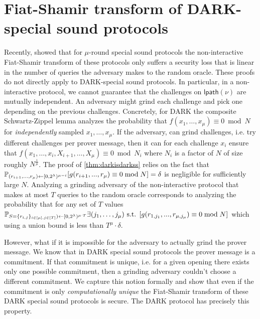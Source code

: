 \section{Fiat-Shamir transform of DARK-special sound protocols} 
Recently, \cite{EPRINT:Wikstrom21,EPRINT:AttFehKlo21} showed that for $\mu$-round special sound protocols the non-interactive Fiat-Shamir transform of these protocols only suffers a security loss that is linear in the number of queries the adversary makes to the random oracle. These proofs do not directly apply to DARK-special sound protocols. In particular, in a non-interactive protocol, we cannot guarantee that the challenges on $\textsf{lpath}(\nu)$ are mutually independent. An adversary might grind each challenge and pick one depending on the previous challenges. Concretely, for DARK the composite Schwartz-Zippel lemma analyzes the probability that $f(x_1,\dots,x_\mu)\equiv 0 \bmod N$ for \emph{independently} sampled $x_1,\dots,x_\mu$. If the adversary, can grind challenges, i.e. try different challenges per prover message, then it can for each challenge $x_i$ ensure that $f(x_1,\dots,x_i,X_{i+1},\dots,X_\mu)\equiv 0 \bmod N_i$ where $N_i$ is a factor of $N$ of size roughly $N^{\frac{1}{\mu}}$. The proof of \cref{thm:darkisdarkss} relies on the fact that $\mathbb{P}_{(r_{i+1},...,r_\mu) \gets [0,2^\lambda)^{\mu -i}} [g(r_{i+1},...,r_\mu)\equiv 0 \bmod N]=\delta$ is negligible for sufficiently large $N$. Analyzing a grinding adversary of the non-interactive protocol that makes at most $T$ queries to the random oracle corresponds to analyzing the probability that for any set of $T$ values $\mathbb{P}_{S=\{r_{i,j}\}_{i\in [\mu], j \in [T]}) \gets [0,2^\lambda)^{\mu \cdot T}}  \exists (j_1,\dots,j_\mu) \text{ s.t. } [g(r_{1,j_1},...,r_{\mu,j_\mu})\equiv 0 \bmod N]$ which using a union bound is less than $T^\mu \cdot \delta$.

However, what if it is impossible for the adversary to actually grind the prover message. We know that in DARK special sound protocols the prover message is a commitment. If that commitment is unique, i.e. for a given opening there exists only one possible commitment, then a grinding adversary couldn't choose a different commitment. We capture this notion formally and show that even if the commitment is only \emph{computationally unique} the Fiat-Shamir transform of these DARK special sound protocols is secure. The DARK protocol has precisely this property.

